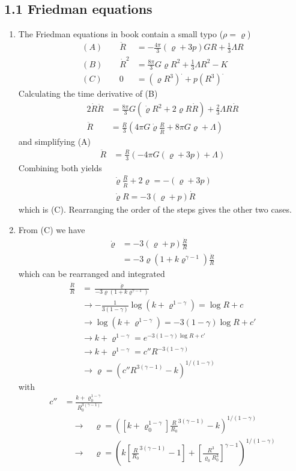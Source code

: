 \documentclass[10pt,a4paper]{book}
\theoremstyle{definition}
\begin{document}
\subsection{1.1 Friedman equations}
\begin{enumerate}
\item The Friedman equations in book contain a small typo ($\rho=\varrho$)
\begin{align}
    (A)\qquad \ddot R&=-\frac{4\pi}{3}(\varrho+3p)GR+\frac{1}{3}\Lambda R\\
    (B)\qquad  \dot R^2&=\frac{8\pi}{3}G\varrho R^2+\frac{1}{3}\Lambda R^2-K\\
    (C)\qquad 0&=(\varrho R^3)^\cdot+p(R^3)^\cdot
\end{align}
Calculating the time derivative of (B)
\begin{align}
    2\dot{R}\ddot{R}&=\frac{8\pi}{3}G(\dot{\varrho}R^2+2\varrho R\dot{R})+\frac{2}{3}\Lambda R\dot{R}\\
    \ddot{R}&=\frac{R}{3}\left(4\pi G\dot\varrho \frac{R}{\dot{R}}+8\pi G\varrho +\Lambda\right)
\end{align}
and simplifying (A)
\begin{align}
    \ddot R&=\frac{R}{3}\left(-4\pi G(\varrho+3p)+\Lambda\right)
\end{align}
Combining both yields
\begin{align}
    \dot\varrho \frac{R}{\dot{R}}+2\varrho=-(\varrho+3p)\\
    \dot\varrho R=-3(\varrho+p)\dot{R}
\end{align}
which is (C). Rearranging the order of the steps gives the other two  cases.
\item From (C) we have
\begin{align}
    \dot\varrho &=-3(\varrho+p)\frac{\dot{R}}{R}\\
    &=-3\varrho\left(1+k\varrho^{\gamma-1}\right)\frac{\dot{R}}{R}
\end{align}
which can be rearranged and integrated
\begin{align}
    \frac{\dot{R}}{R}&=\frac{\dot\varrho}{-3\varrho\left(1+k\varrho^{\gamma-1}\right)}\\
    &\rightarrow-\frac{1}{3(1-\gamma)}\log(k+\varrho^{1-\gamma})=\log R+c\\
    &\rightarrow\log(k+\varrho^{1-\gamma})=-3(1-\gamma)\log R+c'\\
    &\rightarrow k+\varrho^{1-\gamma}=e^{-3(1-\gamma)\log R+c'}\\
    &\rightarrow k+\varrho^{1-\gamma}=c''R^{-3(1-\gamma)}\\
    &\rightarrow \varrho=\left(c''R^{3(\gamma-1)}-k\right)^{1/(1-\gamma)}
\end{align}
with
\begin{align}
    c''&=\frac{k+\varrho_0^{1-\gamma}}{R_0^{3(\gamma-1)}}\\
    &\quad\rightarrow\quad\varrho=\left([k+\varrho_0^{1-\gamma}]\frac{R}{R_0}^{3(\gamma-1)}-k\right)^{1/(1-\gamma)}\\
    &\quad\rightarrow\quad\varrho=\left(k\left[\frac{R}{R_0}^{3(\gamma-1)}-1\right]+\left[\frac{R^3}{\varrho_0R_0^3}\right]^{\gamma-1}\right)^{1/(1-\gamma)}
\end{align}


\end{enumerate}
\end{document}
